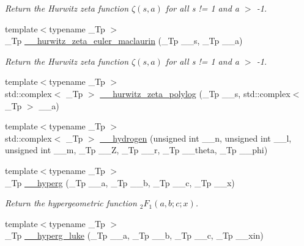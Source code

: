 \begin{DoxyCompactItemize}
\begin{DoxyCompactList}\small\item\em Return the Hurwitz zeta function $ \zeta(s,a) $ for all s != 1 and a $>$ -\/1. \end{DoxyCompactList}\item 
{\footnotesize template$<$typename \+\_\+\+Tp $>$ }\\\+\_\+\+Tp \hyperlink{namespacestd_1_1____detail_a56c55858723fe9e0c541f0e77572b58d}{\+\_\+\+\_\+hurwitz\+\_\+zeta\+\_\+euler\+\_\+maclaurin} (\+\_\+\+Tp \+\_\+\+\_\+s, \+\_\+\+Tp \+\_\+\+\_\+a)
\begin{DoxyCompactList}\small\item\em Return the Hurwitz zeta function $ \zeta(s,a) $ for all s != 1 and a $>$ -\/1. \end{DoxyCompactList}\item 
{\footnotesize template$<$typename \+\_\+\+Tp $>$ }\\std\+::complex$<$ \+\_\+\+Tp $>$ \hyperlink{namespacestd_1_1____detail_a7c45415c3ec0e137eea2364a6dd3af4e}{\+\_\+\+\_\+hurwitz\+\_\+zeta\+\_\+polylog} (\+\_\+\+Tp \+\_\+\+\_\+s, std\+::complex$<$ \+\_\+\+Tp $>$ \+\_\+\+\_\+a)
\item 
{\footnotesize template$<$typename \+\_\+\+Tp $>$ }\\std\+::complex$<$ \+\_\+\+Tp $>$ \hyperlink{namespacestd_1_1____detail_aba60bcf9f002dc900042065999546bc9}{\+\_\+\+\_\+hydrogen} (unsigned int \+\_\+\+\_\+n, unsigned int \+\_\+\+\_\+l, unsigned int \+\_\+\+\_\+m, \+\_\+\+Tp \+\_\+\+\_\+Z, \+\_\+\+Tp \+\_\+\+\_\+r, \+\_\+\+Tp \+\_\+\+\_\+theta, \+\_\+\+Tp \+\_\+\+\_\+phi)
\item 
{\footnotesize template$<$typename \+\_\+\+Tp $>$ }\\\+\_\+\+Tp \hyperlink{namespacestd_1_1____detail_a316589a60d5e5f50201c2d42b980678c}{\+\_\+\+\_\+hyperg} (\+\_\+\+Tp \+\_\+\+\_\+a, \+\_\+\+Tp \+\_\+\+\_\+b, \+\_\+\+Tp \+\_\+\+\_\+c, \+\_\+\+Tp \+\_\+\+\_\+x)
\begin{DoxyCompactList}\small\item\em Return the hypergeometric function $ {}_2F_1(a,b;c;x) $. \end{DoxyCompactList}\item 
{\footnotesize template$<$typename \+\_\+\+Tp $>$ }\\\+\_\+\+Tp \hyperlink{namespacestd_1_1____detail_a0c1ec62b5c39c93ad70a8229a7a6d84d}{\+\_\+\+\_\+hyperg\+\_\+luke} (\+\_\+\+Tp \+\_\+\+\_\+a, \+\_\+\+Tp \+\_\+\+\_\+b, \+\_\+\+Tp \+\_\+\+\_\+c, \+\_\+\+Tp \+\_\+\+\_\+xin)

\end{DoxyCompactItemize}
